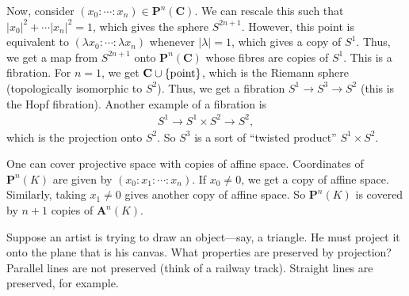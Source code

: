 \documentclass[11pt, oneside,margin=1in]{article}
\begin{document}
Now, consider $(x_0:\cdots : x_n)\in \mathbf{P}^n(\mathbf{C})$. We can rescale this such that $\left\lvert x_0 \right\rvert ^2 + \cdots \left\lvert x_n \right\rvert ^2 = 1$, which gives the sphere $S^{2n+1}$. However, this point is equivalent to $(\lambda x_0:\cdots:\lambda x_n)$ whenever $\left\lvert \lambda \right\rvert =1$, which gives a copy of $S^1$. Thus, we get a map from $S^{2n+1}$ onto $\mathbf{P}^n(\mathbf{C})$ whose fibres are copies of $S^1$. This is a fibration. For $n=1$, we get $\mathbf C \cup \{ \textrm{point}\}$, which is the Riemann sphere (topologically isomorphic to $S^2$). Thus, we get a fibration $S^1 \longrightarrow S^3 \longrightarrow S^2$ (this is the Hopf fibration). Another example of a fibration is 
\begin{align*}
	S^1 \longrightarrow S^1\times S^2 \longrightarrow S^2,
\end{align*}
which is the projection onto $S^2$. So $S^3$ is a sort of ``twisted product'' $S^1\times S^2$.


One can cover projective space with copies of affine space. Coordinates of $\mathbf{P}^n(K)$ are given by $(x_0:x_1:\cdots : x_n)$. If $x_0\ne 0$, we get a copy of affine space. Similarly, taking $x_1\ne 0$ gives another copy of affine space. So $\mathbf{P}^n(K)$ is covered by $n+1$ copies of $\mathbf{A}^n(K)$.

Suppose an artist is trying to draw an object---say, a triangle. He must project it onto the plane that is his canvas. What properties are preserved by projection? Parallel lines are not preserved (think of a railway track). Straight lines are preserved, for example.
\end{document}
